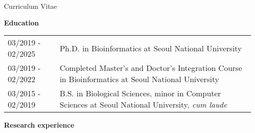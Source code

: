 \documentclass{resume} %
\newcommand{\subheading}[1]{%
  \vspace{0.5mm}%
  {\fontsize{11.5pt}{13pt}\selectfont\bfseries #1}%
  \vspace{1mm}%
}
\begin{document}


\setcounter{tocdepth}{1}

\pagestyle{plain}
\setcounter{page}{1}

\setlength{\oddsidemargin}{-0.2cm}
\setlength{\evensidemargin}{-0.2cm}
\setlength{\linewidth}{16.5cm}
\setlength{\textheight}{26cm}
\setlength{\tabcolsep}{0cm}

\vspace{3mm}
\begin{rSection}{Curriculum Vitae}
\vspace{1mm}

\subheading{Education}

\begin{tabular}{p{3.6cm}p{13.0cm}}
03/2019 - 02/2025 & Ph.D. in Bioinformatics at Seoul National University
\\[1.mm]
03/2019 - 02/2022 & Completed Master's and Doctor's Integration Course in Bioinformatics at Seoul National University
\\[1.mm]
03/2015 - 02/2019 & B.S. in Biological Sciences, minor in Computer Sciences at Seoul National University, \textit{cum laude}
\\[1mm]
\end{tabular}
\vspace{1mm}

\subheading{Research experience}


\end{rSection}
\end{document}
